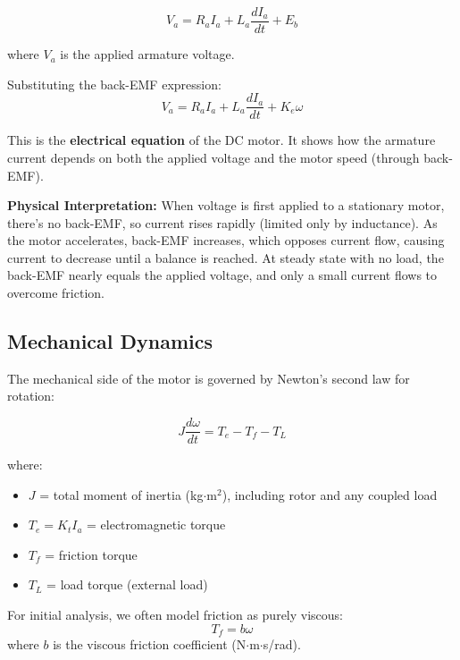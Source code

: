 \begin{equation}
    V_a = R_a I_a + L_a \frac{dI_a}{dt} + E_b
    \label{eq:electrical_kvl}
\end{equation}

where $V_a$ is the applied armature voltage.

Substituting the back-EMF expression:
\begin{equation}
    \boxed{V_a = R_a I_a + L_a \frac{dI_a}{dt} + K_e \omega}
    \label{eq:electrical_equation}
\end{equation}

This is the \textbf{electrical equation} of the DC motor. It shows how the armature current depends on both the applied voltage and the motor speed (through back-EMF).

\textbf{Physical Interpretation:} When voltage is first applied to a stationary motor, there's no back-EMF, so current rises rapidly (limited only by inductance). As the motor accelerates, back-EMF increases, which opposes current flow, causing current to decrease until a balance is reached. At steady state with no load, the back-EMF nearly equals the applied voltage, and only a small current flows to overcome friction.

\subsection{Mechanical Dynamics}

The mechanical side of the motor is governed by Newton's second law for rotation:

\begin{equation}
    J \frac{d\omega}{dt} = T_e - T_f - T_L
    \label{eq:mechanical_newton}
\end{equation}

where:
\begin{itemize}
    \item $J$ = total moment of inertia (kg$\cdot$m$^2$), including rotor and any coupled load
    \item $T_e = K_t I_a$ = electromagnetic torque
    \item $T_f$ = friction torque
    \item $T_L$ = load torque (external load)
\end{itemize}

For initial analysis, we often model friction as purely viscous:
\begin{equation}
    T_f = b \omega
\end{equation}
where $b$ is the viscous friction coefficient (N$\cdot$m$\cdot$s/rad).

